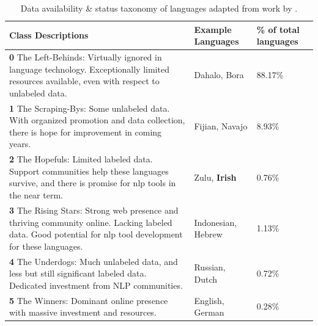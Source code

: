 \documentclass[thesis]{cluu}
\begin{document}
\begin{table}[h]
    \centering
    \begin{tabularx}{\textwidth}{|X|p{2cm}|p{1.75cm}|}
        \hline
        \textbf{Class Descriptions} & \textbf{Example Languages} & \textbf{\% of total languages}\\ \hline
        \textbf{0} The Left-Behinds: Virtually ignored in language technology. Exceptionally limited resources available, even with respect to unlabeled data. & Dahalo, Bora & 88.17\%\\ \hline
        \textbf{1} The Scraping-Bys: Some unlabeled data. With organized promotion and data collection, there is hope for improvement in coming years. & Fijian, Navajo & 8.93\%\\ \hline
        \textbf{2} The Hopefuls: Limited labeled data. Support communities help these languages survive, and there is promise for \gls{nlp} tools in the near term. & Zulu, \textbf{Irish} & 0.76\%\\ \hline
        \textbf{3} The Rising Stars: Strong web presence and thriving community online. Lacking labeled data. Good potential for \gls{nlp} tool development for these languages. & Indonesian, Hebrew & 1.13\%\\ \hline
        \textbf{4} The Underdogs: Much unlabeled data, and less but still significant labeled data. Dedicated investment from NLP communities. & Russian, Dutch & 0.72\%\\ \hline
        \textbf{5} The Winners: Dominant online presence with massive investment and resources. & English, German & 0.28\%\\ \hline
    \end{tabularx}
    \caption{Data availability \& status taxonomy of languages adapted from work by \textcite{joshiStateFateLinguistic2021}.}
    \label{tab:data_availability}
\end{table}
\end{document}
